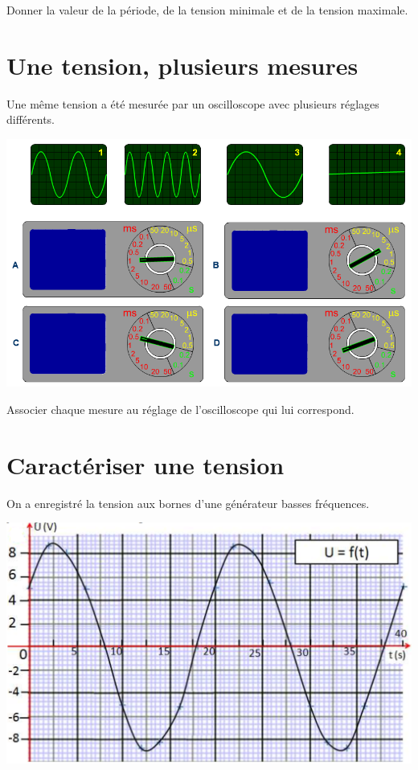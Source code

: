 \documentclass[a4paper,11pt]{exam}
\begin{document}
\begin{questions}
	\question Donner la valeur de la période, de la tension minimale et de la tension maximale.
	\fillwithdottedlines{2cm}
\end{questions}

\newpage

\section{Une tension, plusieurs mesures}

Une même tension a été mesurée par un oscilloscope avec plusieurs réglages différents.

\begin{center}
	\includegraphics[scale=0.5]{img/oscillos2}
\end{center}

\begin{questions}
	\question Associer chaque mesure au réglage de l'oscilloscope qui lui correspond.\fillwithdottedlines{2cm}
\end{questions}

\section{Caractériser une tension}

On a enregistré la tension aux bornes d'une générateur basses fréquences.

\begin{center}
	\includegraphics[scale=0.5]{img/tension}
\end{center}
\end{document}
